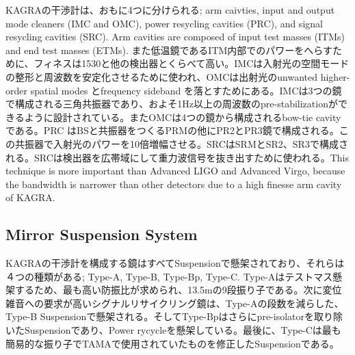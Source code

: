 KAGRAの干渉計は、おもに4つに分けられる; arm caivties, input and output mode cleaners (IMC and OMC), power resycling cavities (PRC), and signal resycling cavities (SRC). Arm cavities are composed of input test masses (ITMs) and end test masses (ETMs). また低温鏡であるITM内部でのパワーをへらすために、フィネスは1530と他の検出器とくらべて高い。IMCは入射光の空間モードの整形と周波数を安定化させるために使われ、OMCは出射光のunwanted higher-order spatial modes とfrequency sideband を落とすためにある。IMCは3つの鏡で構成される三角共振器であり、およそ1Hz以上の周波数のpre-stabilizationができるように設計されている。またOMCは4つの鏡から構成されるbow-tie cavityである。PRC はBSと共振器をつくるPRMの他にPR2とPR3鏡で構成される。この共振器で入射光のパワーを10倍増幅させる。SRCはSRMとSR2、SR3で構成される。SRCは検出器を広帯域にして重力波信号を抜き出すために使われる。This technique is more important than Advanced LIGO and Advanced Virgo, because the bandwidth is narrower than other detectors due to a high finesse arm cavity of KAGRA. 

\subsection{Mirror Suspension System}
KAGRAの干渉計を構成する鏡はすべてSuspensionで懸架されており、それらは４つの種類がある; Type-A, Type-B, Type-Bp, Type-C. Type-Aはテストマス懸架するため、最も高い防振比が求められ、13.5mの9段振り子である。次に変位雑音への要求が高いシグナルリサイクリング鏡は、Type-Aの段数を減らした、Type-B Suspensionで懸架される。そしてType-Bpはさらにpre-isolatorを取り除いたSuspensionであり、Power rycycleを懸架している。最後に、Type-Cは最も簡易的な振り子でTAMAで使用されていたものを修正したSuspensionである。

